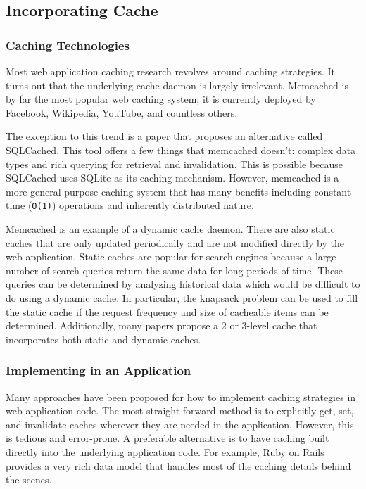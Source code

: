 \documentclass[12pt]{ucthesis}
\begin{document}
\subsection{Incorporating Cache}
\subsubsection{Caching Technologies}
Most web application caching research revolves around caching strategies.
It turns out that the underlying cache daemon is largely irrelevant.
Memcached is by far the most popular web caching system; it is currently deployed by Facebook, Wikipedia, YouTube, and countless others.\cite{memcachedDotOrg}

The exception to this trend is a paper that proposes an alternative called SQLCached.\cite{sqlCached}
This tool offers a few things that memcached doesn't: complex data types and rich querying for retrieval and invalidation.
This is possible because SQLCached uses SQLite as its caching mechanism.
However, memcached is a more general purpose caching system that has many benefits including constant time ({\tt O(1)}) operations and inherently distributed nature.\cite{memcachedDotOrg}

Memcached is an example of a dynamic cache daemon.
There are also static caches that are only updated periodically and are not modified directly by the web application.
Static caches are popular for search engines because a large number of search queries return the same data for long periods of time.
These queries can be determined by analyzing historical data which would be difficult to do using a dynamic cache.\cite{designTradeOffsSearchEngine}
In particular, the knapsack problem can be used to fill the static cache if the request frequency and size of cacheable items can be determined.\cite{designTradeOffsSearchEngine}
Additionally, many papers propose a 2 or 3-level cache that incorporates both static and dynamic caches.\cite{cacheAdmissionPolicies}\cite{designTradeOffsSearchEngine}

\subsubsection{Implementing in an Application}
Many approaches have been proposed for how to implement caching strategies in web application code.
The most straight forward method is to explicitly get, set, and invalidate caches wherever they are needed in the application.
However, this is tedious and error-prone.\cite{keyBasedCacheExpiration}\cite{triggerBasedORM}
A preferable alternative is to have caching built directly into the underlying application code.
For example, Ruby on Rails provides a very rich data model that handles most of the caching details behind the scenes.\cite{keyBasedCacheExpiration}
\end{document}
